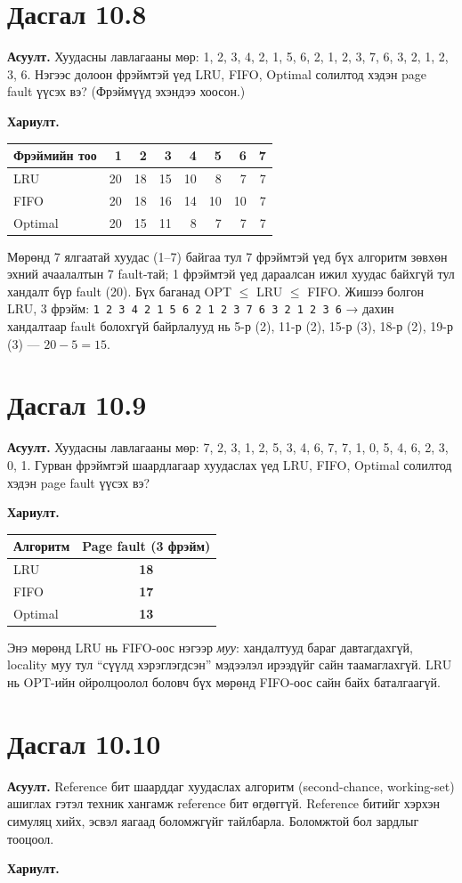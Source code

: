 \documentclass[12pt,a4paper]{article}
\newcommand{\question}[2]{\section{Дасгал #1}\textbf{Асуулт.} #2\par\medskip\textbf{Хариулт.}\par}
\begin{document}
\question{10.8}{Хуудасны лавлагааны мөр: 1, 2, 3, 4, 2, 1, 5, 6, 2, 1, 2, 3, 7, 6, 3, 2, 1, 2, 3, 6. Нэгээс долоон фрэймтэй үед LRU, FIFO, Optimal солилтод хэдэн page fault үүсэх вэ? (Фрэймүүд эхэндээ хоосон.)}

\begin{center}
\begin{tabular}{lrrrrrrr}
\toprule
Фрэймийн тоо & 1 & 2 & 3 & 4 & 5 & 6 & 7\\
\midrule
LRU     & 20 & 18 & 15 & 10 & 8 & 7 & 7\\
FIFO    & 20 & 18 & 16 & 14 & 10 & 10 & 7\\
Optimal & 20 & 15 & 11 & 8 & 7 & 7 & 7\\
\bottomrule
\end{tabular}
\end{center}
Мөрөнд 7 ялгаатай хуудас (1–7) байгаа тул 7 фрэймтэй үед бүх алгоритм зөвхөн эхний ачаалалтын 7 fault-тай; 1 фрэймтэй үед дараалсан ижил хуудас байхгүй тул хандалт бүр fault (20). Бүх баганад OPT $\le$ LRU $\le$ FIFO. Жишээ болгон LRU, 3 фрэйм: \texttt{1 2 3 4 2 1 5 6 2 1 2 3 7 6 3 2 1 2 3 6} → дахин хандалтаар fault болохгүй байрлалууд нь 5-р (2), 11-р (2), 15-р (3), 18-р (2), 19-р (3) — $20 - 5 = 15$.

\question{10.9}{Хуудасны лавлагааны мөр: 7, 2, 3, 1, 2, 5, 3, 4, 6, 7, 7, 1, 0, 5, 4, 6, 2, 3, 0, 1. Гурван фрэймтэй шаардлагаар хуудаслах үед LRU, FIFO, Optimal солилтод хэдэн page fault үүсэх вэ?}

\begin{center}
\begin{tabular}{lc}
\toprule
Алгоритм & Page fault (3 фрэйм)\\
\midrule
LRU & \textbf{18}\\
FIFO & \textbf{17}\\
Optimal & \textbf{13}\\
\bottomrule
\end{tabular}
\end{center}
Энэ мөрөнд LRU нь FIFO-оос нэгээр \emph{муу}: хандалтууд бараг давтагдахгүй, locality муу тул “сүүлд хэрэглэгдсэн” мэдээлэл ирээдүйг сайн таамаглахгүй. LRU нь OPT-ийн ойролцоолол боловч бүх мөрөнд FIFO-оос сайн байх баталгаагүй.

\question{10.10}{Reference бит шаарддаг хуудаслах алгоритм (second-chance, working-set) ашиглах гэтэл техник хангамж reference бит өгдөггүй. Reference битийг хэрхэн симуляц хийх, эсвэл яагаад боломжгүйг тайлбарла. Боломжтой бол зардлыг тооцоол.}
\end{document}
